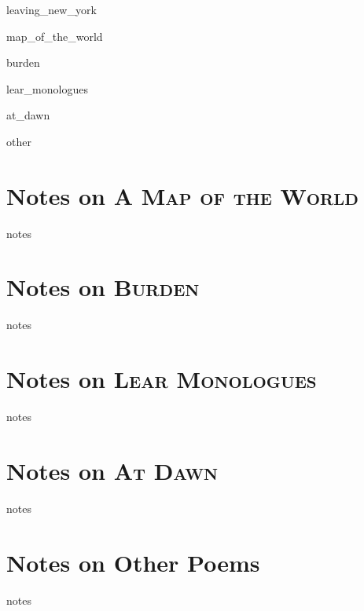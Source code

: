 \documentclass[twoside,openright,final,11pt]{memoir}
\begin{document}
\newcommand*{\starbreak}{\hspace{0.4\versewidth}*\quad*\quad*}

\mainmatter
\pagestyle{myheadings}

{leaving_new_york}

{map_of_the_world}

{burden}

{lear_monologues}


{at_dawn}

{other}

\renewcommand\appendixname{Notes}
\renewcommand\appendixpagename{Notes}
\renewcommand\appendixtocname{Notes}

\backmatter
\appendix
{}


\chapter{Notes on \textsc{A Map of the World}}
\thispagestyle{myheadings}
{notes}

\chapter{Notes on \textsc{Burden}}
\thispagestyle{myheadings}
{notes}

\chapter{Notes on \textsc{Lear Monologues}}
\thispagestyle{myheadings}
{notes}

\chapter{Notes on \textsc{At Dawn}}
\thispagestyle{myheadings}
{notes}

\chapter{Notes on Other Poems}
\thispagestyle{myheadings}
{notes}
\end{document}

